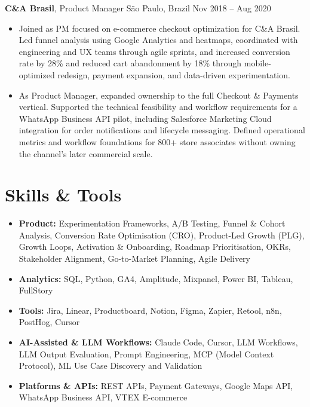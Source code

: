 \documentclass[11pt,a4paper]{article}
\begin{document}
\vspace{6pt}

\noindent\textbf{C\&A Brasil}, Product Manager \hfill São Paulo, Brazil \textbar{} Nov 2018 -- Aug 2020
\begin{itemize}[leftmargin=*, label=$\bullet$, itemsep=5pt, parsep=0pt]
\item Joined as PM focused on e-commerce checkout optimization for C\&A Brasil. Led funnel analysis using Google Analytics and heatmaps, coordinated with engineering and UX teams through agile sprints, and increased conversion rate by 28\% and reduced cart abandonment by 18\% through mobile-optimized redesign, payment expansion, and data-driven experimentation.

\item As Product Manager, expanded ownership to the full Checkout \& Payments vertical. Supported the technical feasibility and workflow requirements for a WhatsApp Business API pilot, including Salesforce Marketing Cloud integration for order notifications and lifecycle messaging. Defined operational metrics and workflow foundations for 800+ store associates without owning the channel's later commercial scale.
\end{itemize}

\vspace{6pt}

\section*{Skills \& Tools}
\begin{itemize}[leftmargin=*, label=$\bullet$, itemsep=3pt, parsep=0pt]
\item \textbf{Product:} Experimentation Frameworks, A/B Testing, Funnel \& Cohort Analysis, Conversion Rate Optimisation (CRO), Product-Led Growth (PLG), Growth Loops, Activation \& Onboarding, Roadmap Prioritisation, OKRs, Stakeholder Alignment, Go-to-Market Planning, Agile Delivery
\item \textbf{Analytics:} SQL, Python, GA4, Amplitude, Mixpanel, Power BI, Tableau, FullStory
\item \textbf{Tools:} Jira, Linear, Productboard, Notion, Figma, Zapier, Retool, n8n, PostHog, Cursor
\item \textbf{AI-Assisted \& LLM Workflows:} Claude Code, Cursor, LLM Workflows, LLM Output Evaluation, Prompt Engineering, MCP (Model Context Protocol), ML Use Case Discovery and Validation
\item \textbf{Platforms \& APIs:} REST APIs, Payment Gateways, Google Maps API, WhatsApp Business API, VTEX E-commerce

\end{itemize}
\end{document}
